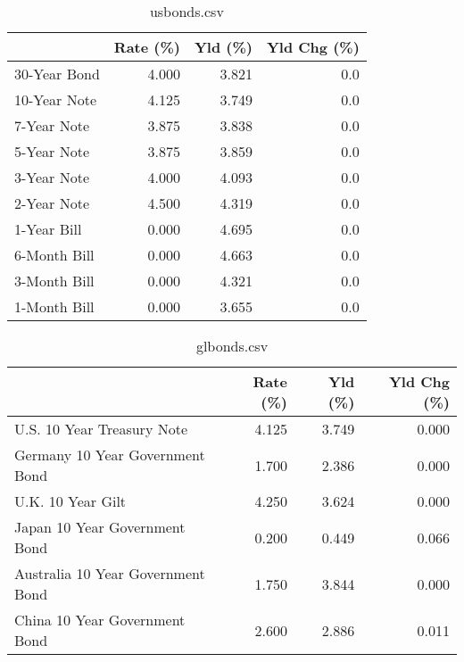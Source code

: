 \documentclass{article}%
\begin{document}
%


\begin{table}[htbp]%
\caption{usbonds.csv}%
\centering%
\begin{adjustbox}{width=1\textwidth}%
\begin{tabular}{lrrr}
\toprule
             &  Rate (\%) &  Yld (\%) &  Yld Chg (\%) \\
\midrule
30-Year Bond &     4.000 &    3.821 &          0.0 \\
10-Year Note &     4.125 &    3.749 &          0.0 \\
 7-Year Note &     3.875 &    3.838 &          0.0 \\
 5-Year Note &     3.875 &    3.859 &          0.0 \\
 3-Year Note &     4.000 &    4.093 &          0.0 \\
 2-Year Note &     4.500 &    4.319 &          0.0 \\
 1-Year Bill &     0.000 &    4.695 &          0.0 \\
6-Month Bill &     0.000 &    4.663 &          0.0 \\
3-Month Bill &     0.000 &    4.321 &          0.0 \\
1-Month Bill &     0.000 &    3.655 &          0.0 \\
\bottomrule
\end{tabular}
%
\end{adjustbox}%
\end{table}

%


\begin{table}[htbp]%
\caption{glbonds.csv}%
\centering%
\begin{adjustbox}{width=1\textwidth}%
\begin{tabular}{lrrr}
\toprule
                                  &  Rate (\%) &  Yld (\%) &  Yld Chg (\%) \\
\midrule
       U.S. 10 Year Treasury Note &     4.125 &    3.749 &        0.000 \\
  Germany 10 Year Government Bond &     1.700 &    2.386 &        0.000 \\
                U.K. 10 Year Gilt &     4.250 &    3.624 &        0.000 \\
    Japan 10 Year Government Bond &     0.200 &    0.449 &        0.066 \\
Australia 10 Year Government Bond &     1.750 &    3.844 &        0.000 \\
    China 10 Year Government Bond &     2.600 &    2.886 &        0.011 \\
\bottomrule
\end{tabular}
%
\end{adjustbox}%
\end{table}
\end{document}
